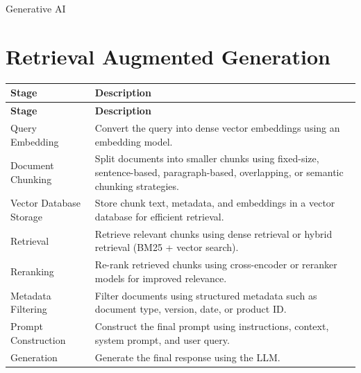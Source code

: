 \documentclass[10pt,a4paper]{article}
\newcommand{\NoteTitle}{Generative AI}
\newcommand{\NoteAuthor}{Thomaskutty Reji}
\begin{document}
\begin{titlepage}
  \vspace*{0.25\textheight}
  {\LARGE \textcolor{tocblue}{\NoteTitle}}\par
  \author{\NoteAuthor}
  \date{}
\end{titlepage}

\label{toc}
\tableofcontents
\newpage


\section{Retrieval Augmented Generation}\label{retrieval-augmented-generation}

\begin{longtable}{p{} p{}}
\toprule
\textbf{Stage} & \textbf{Description} \\
\midrule
\endfirsthead

\toprule
\textbf{Stage} & \textbf{Description} \\
\midrule
\endhead

\bottomrule
\endfoot

Query Embedding &
Convert the query into dense vector embeddings using an embedding model. \\

Document Chunking &
Split documents into smaller chunks using fixed-size, sentence-based, paragraph-based, overlapping, or semantic chunking strategies. \\

Vector Database Storage &
Store chunk text, metadata, and embeddings in a vector database for efficient retrieval. \\

Retrieval &
Retrieve relevant chunks using dense retrieval or hybrid retrieval (BM25 + vector search). \\

Reranking &
Re-rank retrieved chunks using cross-encoder or reranker models for improved relevance. \\

Metadata Filtering &
Filter documents using structured metadata such as document type, version, date, or product ID. \\

Prompt Construction &
Construct the final prompt using instructions, context, system prompt, and user query. \\

Generation &
Generate the final response using the LLM. \\
\end{longtable}
\end{document}
